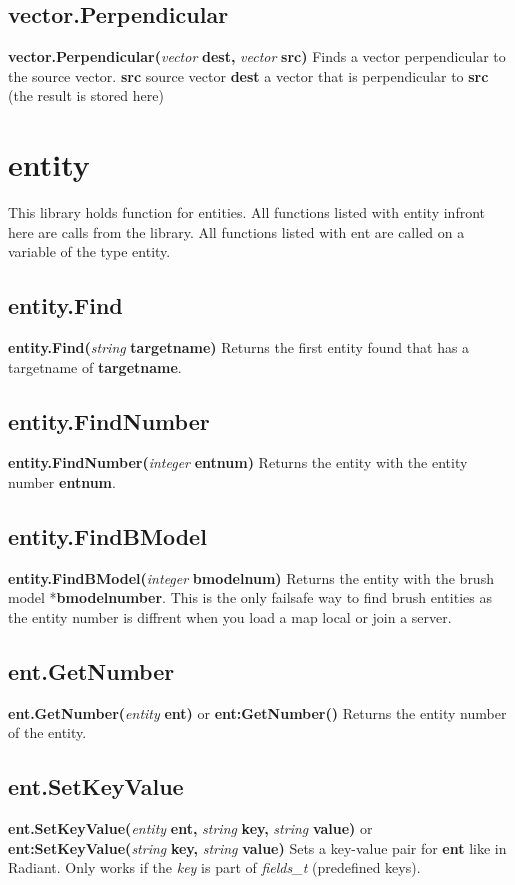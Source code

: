 \documentclass{scrreprt}
\begin{document}
\subsection{vector.Perpendicular}
\label{vect-Perpendicular}
\textbf{vector.Perpendicular(}\textit{vector}\textbf{ dest, }\textit{vector}\textbf{ src)}
\newline
Finds a vector perpendicular to the source vector.
\textbf{src} source vector
\textbf{dest} a vector that is perpendicular to \textbf{src} (the result is stored here)
\newpage
\section{entity}
\label{enty}
This library holds function for entities. All functions listed with entity infront here are calls from the library. All functions listed with ent are called on a variable of the type entity.
\subsection{entity.Find}
\label{enty-find}
\textbf{entity.Find(}\textit{string}\textbf{ targetname)}
\newline
Returns the first entity found that has a targetname of \textbf{targetname}.
\subsection{entity.FindNumber}
\label{enty.findnumber}
\textbf{entity.FindNumber(}\textit{integer}\textbf{ entnum)}
\newline
Returns the entity with the entity number \textbf{entnum}.
\subsection{entity.FindBModel}
\label{enty-findbmodel}
\textbf{entity.FindBModel(}\textit{integer}\textbf{ bmodelnum)}
\newline
Returns the entity with the brush model *\textbf{bmodelnumber}. This is the only failsafe way to find brush entities as the entity number is diffrent when you load a map local or join a server.
\subsection{ent.GetNumber}
\label{enty-getnumber}
\textbf{ent.GetNumber(}\textit{entity}\textbf{ ent)} or \textbf{ent:GetNumber()}
\newline
Returns the entity number of the entity.
\subsection{ent.SetKeyValue}
\label{enty-setkeyvalue}
\textbf{ent.SetKeyValue(}\textit{entity}\textbf{ ent, }\textit{string}\textbf{ key, }\textit{string}\textbf{ value)} or \textbf{ent:SetKeyValue(}\textit{string}\textbf{ key, }\textit{string}\textbf{ value)}
\newline
Sets a key-value pair for \textbf{ent} like in Radiant. Only works if the \textit{key} is part of \textit{fields\_t} (predefined keys).
\end{document}
